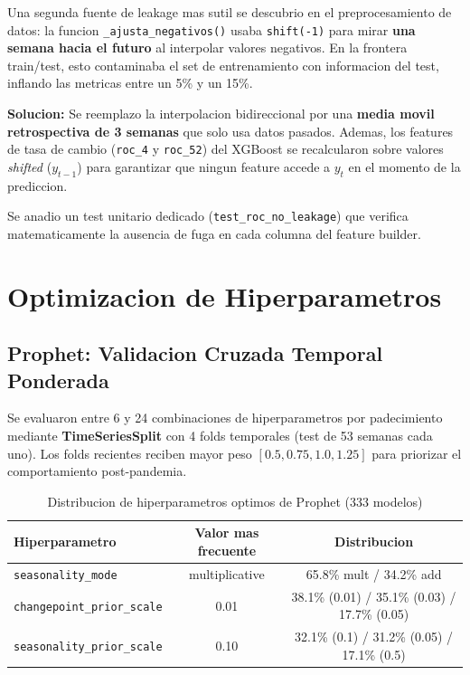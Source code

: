 \documentclass[12pt, letterpaper]{article}
\begin{document}
Una segunda fuente de leakage mas sutil se descubrio en el preprocesamiento de datos: la funcion \texttt{\_ajusta\_negativos()} usaba \texttt{shift(-1)} para mirar \textbf{una semana hacia el futuro} al interpolar valores negativos. En la frontera train/test, esto contaminaba el set de entrenamiento con informacion del test, inflando las metricas entre un 5\% y un 15\%.

\textbf{Solucion:} Se reemplazo la interpolacion bidireccional por una \textbf{media movil retrospectiva de 3 semanas} que solo usa datos pasados. Ademas, los features de tasa de cambio (\texttt{roc\_4} y \texttt{roc\_52}) del XGBoost se recalcularon sobre valores \textit{shifted} ($y_{t-1}$) para garantizar que ningun feature accede a $y_t$ en el momento de la prediccion.

Se anadio un test unitario dedicado (\texttt{test\_roc\_no\_leakage}) que verifica matematicamente la ausencia de fuga en cada columna del feature builder.

\newpage

\section{Optimizacion de Hiperparametros}\label{sec:opt}

\subsection{Prophet: Validacion Cruzada Temporal Ponderada}

Se evaluaron entre 6 y 24 combinaciones de hiperparametros por padecimiento mediante \textbf{TimeSeriesSplit} con 4 folds temporales (test de 53 semanas cada uno). Los folds recientes reciben mayor peso $[0.5, 0.75, 1.0, 1.25]$ para priorizar el comportamiento post-pandemia.

\begin{table}[H]
\centering
\caption{Distribucion de hiperparametros optimos de Prophet (333 modelos)}
\label{tab:prophet_hp}
\small
\begin{tabular}{lcc}
\toprule
\textbf{Hiperparametro} & \textbf{Valor mas frecuente} & \textbf{Distribucion} \\
\midrule
\texttt{seasonality\_mode} & multiplicative & 65.8\% mult / 34.2\% add \\
\texttt{changepoint\_prior\_scale} & 0.01 & 38.1\% (0.01) / 35.1\% (0.03) / 17.7\% (0.05) \\
\texttt{seasonality\_prior\_scale} & 0.10 & 32.1\% (0.1) / 31.2\% (0.05) / 17.1\% (0.5) \\
\bottomrule
\end{tabular}
\end{table}
\end{document}
